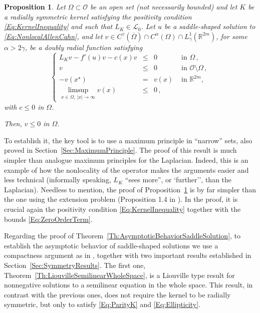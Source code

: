 \documentclass[12pt,reqno]{amsart}
\newtheorem{proposition}[theorem]{Proposition}
\theoremstyle{definition}
\theoremstyle{remark}
\newcommand{\con}[1]{\mathbb{#1}}
\newcommand{\R}{\con{R}} %
\newcommand{\lcal}{\mathcal{L}}
\newcommand{\ocal}{\mathcal{O}}
\newcommand{\s}{\gamma}
\newcommand\beqc[1]{\left\{\begin{array}{#1}}
\newcommand\eeqc{\end{array} \right.}
\def\PDEsystem{rcll}
\def\ds{\displaystyle}
\numberwithin{equation}{section}
\begin{document}
\begin{proposition}
	\label{Prop:MaximumPrincipleLinearized}
	Let $\Omega \subset \ocal$ be an open set (not necessarily bounded) and let $K$ be a radially symmetric kernel satisfying the positivity condition \eqref{Eq:KernelInequality} and such that $L_K\in \lcal_0$. Let $u$ be a saddle-shaped solution to \eqref{Eq:NonlocalAllenCahn}, and let $v\in C^\s(\overline{\Omega})\cap C^\alpha(\Omega)\cap L^1_\s(\R^{2m})$, for some $\alpha > 2\s$, be a doubly radial function satisfying
	$$
	\beqc{\PDEsystem}
	L_K v - f'(u)v - c(x)v &\leq & 0 &\textrm{ in } \Omega\,,\\
	v &\leq & 0 &\textrm{ in } \ocal \setminus \Omega\,,\\
	- v(x^\star) & = & v(x) &\textrm{ in } \R^{2m},\\
	\ds \limsup_{x\in \Omega, \ |x|\to \infty} v(x) &\leq & 0\,,
	\eeqc
	$$
	with $c\leq 0$ in $\Omega$.
	
	Then, $v \leq 0$ in $\Omega$.
\end{proposition}


To establish it, the key tool is to use a maximum principle in ``narrow'' sets, also proved in Section~\ref{Sec:MaximumPrinciple}. The proof of this result is much simpler than analogue maximum principles for the Laplacian. Indeed, this is an example of how the nonlocality of the operator makes the arguments easier and less technical (informally speaking, $L_K$ ``sees more'', or `further'', than the Laplacian). Needless to mention, the proof of Proposition~\ref{Prop:MaximumPrincipleLinearized} is by far simpler than the one using the extension problem (Proposition 1.4 in \cite{Felipe-Sanz-Perela:SaddleFractional}). In the proof, it is crucial again the positivity condition \eqref{Eq:KernelInequality} together with the bounds \eqref{Eq:ZeroOrderTerm}.

Regarding the proof of Theorem~\ref{Th:AsymptoticBehaviorSaddleSolution}, to establish the asymptotic behavior of saddle-shaped solutions we use a compactness argument as in \cite{CabreTerraII, Cinti-Saddle, Cinti-Saddle2}, together with two important results established in Section~\ref{Sec:SymmetryResults}. The first one, Theorem~\ref{Th:LiouvilleSemilinearWholeSpace}, is a Liouville type result for nonnegative solutions to a semilinear equation in the whole space. This result, in contrast with the previous ones, does not require the kernel to be radially symmetric, but only to satisfy \eqref{Eq:ParityK} and \eqref{Eq:Ellipticity}.
\end{document}
